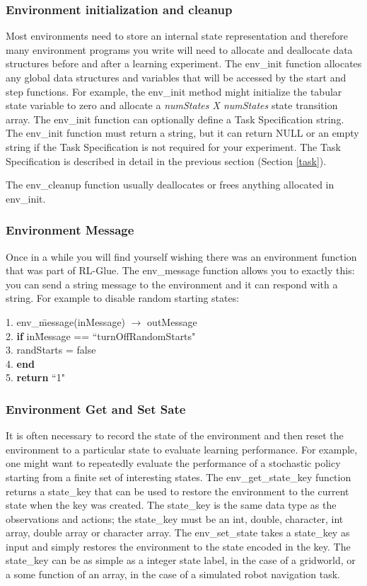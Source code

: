\documentclass[11pt]{article}
\begin{document}
        
\subsubsection{Environment initialization and cleanup}        
Most environments need to store an internal state representation  and therefore many environment programs you write will need to allocate and deallocate data structures before and after a learning experiment. The env\_init function allocates any global data structures and variables that will be accessed by the start and step functions. For example, the env\_init method might initialize the tabular state variable to zero and allocate a {\it numStates X numStates} state transition array. The env\_init function can optionally define a Task Specification string. The env\_init function must return a string, but it can return NULL or an empty string if the Task Specification is not required for your experiment. The Task Specification is described in detail in the previous section (Section \ref{task}).


The env\_cleanup function usually deallocates or frees anything allocated in env\_init.

\subsubsection{Environment Message}
Once in a while you will find yourself wishing there was an environment function that was part of RL-Glue. The env\_message function allows you to exactly this: you can send a string message to the environment and it can respond with a string. For example to disable random starting states:
\begin{tabbing}
1. env\_\=message(inMessage) $\rightarrow$ outMessage\\
2.\> {\bf if} in\=Message == ``turnOffRandomStarts"  \\
3. \>\> randStarts = false\\
4. \> {\bf end} \\
5. {\bf return} ``1"
\end{tabbing}

\subsubsection{Environment Get and Set Sate}
It is often necessary to record the state of the environment and then reset the environment to a particular state to evaluate learning performance. For example, one might want to repeatedly evaluate the performance of a stochastic policy starting from a finite set of interesting states. The env\_get\_state\_key function returns a state\_key that can be used to restore the environment to the current state when the key was created. The state\_key is the same data type as the observations and actions; the state\_key must be an int, double, character, int array, double array or character array. The env\_set\_state takes a state\_key as input and simply restores the environment to the state encoded in the key. The state\_key can be as simple as a integer state label, in the case of a gridworld, or a some function of an array, in the case of a simulated robot navigation task. 
\end{document}
